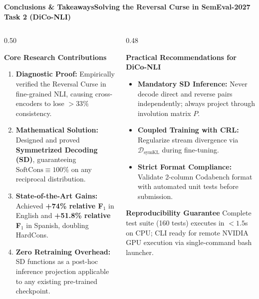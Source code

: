 \documentclass[aspectratio=169,10pt]{beamer}
\begin{document}
\begin{frame}{\textbf{Conclusions \& Takeaways}}{\textbf{Solving the Reversal Curse in SemEval-2027 Task 2 (DiCo-NLI)}}
  \begin{columns}[T]
    \begin{column}{0.50\textwidth}
      \begin{block}{\textbf{Core Research Contributions}}
        \small
        \begin{enumerate}
          \item \textbf{Diagnostic Proof:} Empirically verified the Reversal Curse in fine-grained NLI, causing cross-encoders to lose $>33\%$ consistency.
          \item \textbf{Mathematical Solution:} Designed and proved \textbf{Symmetrized Decoding (SD)}, guaranteeing $\text{SoftCons} \equiv 100\%$ on any reciprocal distribution.
          \item \textbf{State-of-the-Art Gains:} Achieved \textbf{+74\% relative F$_1$} in English and \textbf{+51.8\% relative F$_1$} in Spanish, doubling HardCons.
          \item \textbf{Zero Retraining Overhead:} SD functions as a post-hoc inference projection applicable to any existing pre-trained checkpoint.
        \end{enumerate}
      \end{block}
    \end{column}

    \begin{column}{0.48\textwidth}
      \begin{exampleblock}{\textbf{Practical Recommendations for DiCo-NLI}}
        \small
        \begin{itemize}
          \item \textbf{Mandatory SD Inference:} Never decode direct and reverse pairs independently; always project through involution matrix $P$.
          \item \textbf{Coupled Training with CRL:} Regularize stream divergence via $\mathcal{D}_{\text{symKL}}$ during fine-tuning.
          \item \textbf{Strict Format Compliance:} Validate 2-column Codabench format with automated unit tests before submission.
        \end{itemize}
      \end{exampleblock}
      \vspace{0.1cm}
      \begin{block}{\textbf{Reproducibility Guarantee}}
        \small
        Complete test suite (160 tests) executes in $<1.5$s on CPU; CLI ready for remote NVIDIA GPU execution via single-command bash launcher.
      \end{block}
    \end{column}
  \end{columns}
\end{frame}
\end{document}
